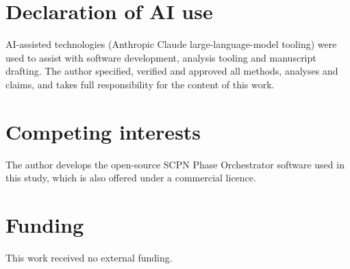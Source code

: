\documentclass[11pt]{article}
\begin{document}
\section*{Declaration of AI use}

AI-assisted technologies (Anthropic Claude large-language-model
tooling) were used to assist with software development, analysis
tooling and manuscript drafting. The author specified, verified and
approved all methods, analyses and claims, and takes full
responsibility for the content of this work.

\section*{Competing interests}

The author develops the open-source SCPN Phase Orchestrator software
used in this study, which is also offered under a commercial licence.

\section*{Funding}

This work received no external funding.
\end{document}
